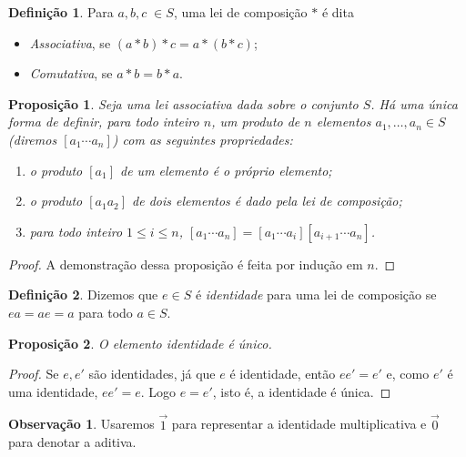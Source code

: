 \documentclass[a4paper,12pt]{report}
\theoremstyle{plain}
\newtheorem{proposicao}{Proposição}[section]
\theoremstyle{definition}
\newtheorem{definicao}{Definição}[section]
\newtheorem{observacao}{Observação}[section]
\begin{document}
	
	\begin{definicao}
		Para $a,b,c \; \in S$, uma lei de composição $*$ é dita
		
		\begin{itemize}
			\item \emph{Associativa}, se $(a*b)*c = a*(b*c)$;
			\item \emph{Comutativa}, se \(a*b = b*a\).
		\end{itemize}
	\end{definicao}
	
	\begin{proposicao}
		Seja uma lei associativa dada sobre o conjunto
		\(S\). Há uma única forma de definir, para todo inteiro \(n\), um
		produto de \(n\) elementos \(a_1,\dots,a_n \in S\) (diremos
		\([a_1\dotsb a_n]\)) com as seguintes propriedades:
		
		\begin{enumerate}
			\def\labelenumi{\arabic{enumi}.}
			\item
			o produto \([a_1]\) de um elemento é o próprio elemento;
			\item
			o produto \([a_1a_2]\) de dois elementos é dado pela lei de
			composição;
			\item
			para todo inteiro \(1\leq i\leq n\),
			\([a_1\dotsb a_n] = [a_1\dotsb a_i][a_{i+1}\dotsb a_n]\).
		\end{enumerate}
	\end{proposicao}
	
	\begin{proof}
		A demonstração dessa proposição é feita por indução em \(n\).
	\end{proof}
	
	\begin{definicao}
		Dizemos que \(e\in S\) é \emph{identidade} para uma lei de composição se \(ea = ae = a\) para todo \(a\in S\).
	\end{definicao}
	
	\begin{proposicao}
		O elemento identidade é único.
	\end{proposicao}
	\begin{proof}
		Se \(e,e'\) são identidades, já que \(e\) é identidade, então \(ee' = e'\) e, como $e'$ é uma identidade, \(ee' = e\). Logo \(e = e'\), isto é, a identidade é única.
	\end{proof}
	
	\begin{observacao}
		Usaremos $\vec{1}$ para representar a identidade multiplicativa e $\vec{0}$ para denotar a aditiva.
	\end{observacao}
	
\end{document}
